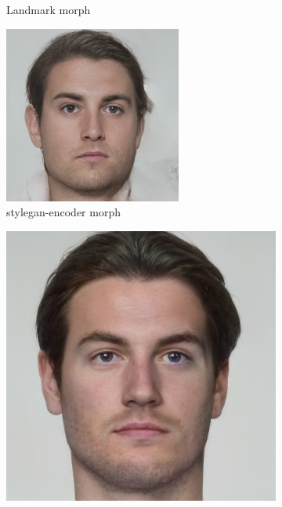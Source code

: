 \documentclass[12pt]{article}
\begin{document}
\begin{figure}[t]
\begin{subfigure}{0.19\textwidth}
        \caption{Landmark morph}
        \label{morph_comp_2}
    \end{subfigure}
    \begin{subfigure}{0.19\textwidth}
        \centering
        \includegraphics[width=\textwidth]{sgan1_morph.png}
        \caption{stylegan-encoder morph}
        \label{morph_comp_3}
    \end{subfigure}
    \begin{subfigure}{0.19\textwidth}
        \centering
        \includegraphics[width=\textwidth]{sgan2_morph.png}

\end{subfigure}
\end{figure}
\end{document}
